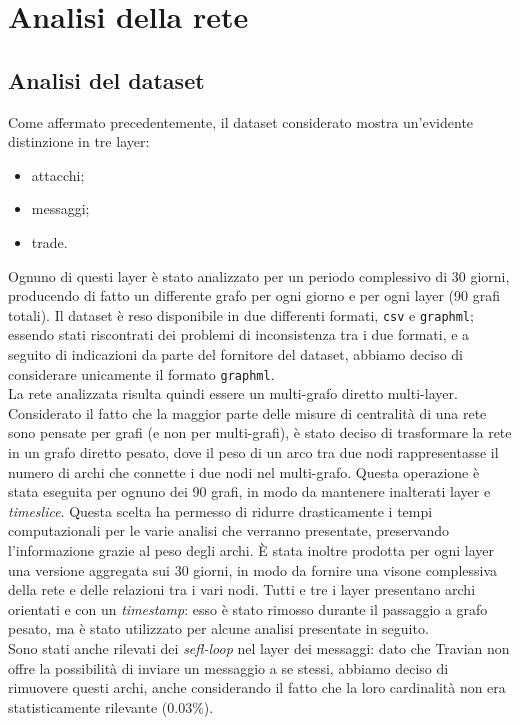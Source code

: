 \chapter{Analisi della rete}
\section{Analisi del dataset}
Come affermato precedentemente, il dataset considerato mostra un'evidente distinzione in tre layer:
\begin{itemize}
	\item attacchi;
	\item messaggi;
	\item trade.
\end{itemize}
Ognuno di questi layer è stato analizzato per un periodo complessivo di 30 giorni, producendo di fatto un differente grafo per ogni giorno e per ogni layer (90 grafi totali).
Il dataset è reso disponibile in due differenti formati, \texttt{csv} e \texttt{graphml}; essendo stati riscontrati dei problemi di inconsistenza tra i due formati, e a seguito di indicazioni da parte del fornitore del dataset, abbiamo deciso di considerare unicamente il formato \texttt{graphml}.\\

La rete analizzata risulta quindi essere un multi-grafo diretto multi-layer. Considerato il fatto che la maggior parte delle misure di centralità di una rete sono pensate per grafi (e non per multi-grafi), è stato deciso di trasformare la rete in un grafo diretto pesato, dove il peso di un arco tra due nodi rappresentasse il numero di archi che connette i due nodi nel multi-grafo. Questa operazione è stata eseguita per ognuno dei 90 grafi, in modo da mantenere inalterati layer e \textit{timeslice}. Questa scelta ha permesso di ridurre drasticamente i tempi computazionali per le varie analisi che verranno presentate, preservando l'informazione grazie al peso degli archi.
È stata inoltre prodotta per ogni layer una versione aggregata sui 30 giorni, in modo da fornire una visone complessiva della rete e delle relazioni tra i vari nodi.
Tutti e tre i layer presentano archi orientati e con un \textit{timestamp}: esso è stato rimosso durante il passaggio a grafo pesato, ma è stato utilizzato per alcune analisi presentate in seguito.\\
Sono stati anche rilevati dei \textit{sefl-loop} nel layer dei messaggi: dato che Travian non offre la possibilità di inviare un messaggio a se stessi, abbiamo deciso di rimuovere questi archi, anche considerando il fatto che la loro cardinalità non era statisticamente rilevante ($0.03\%$).

